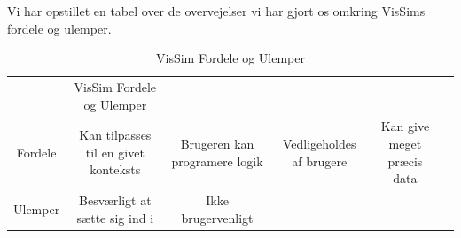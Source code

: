 Vi har opstillet en tabel over de overvejelser vi har gjort os omkring VisSims fordele og ulemper.

\begin{table}[]
\centering
\caption{VisSim Fordele og Ulemper}
\label{VisSimProsAndCons}
\begin{tabular}{|c|c|c|c|c|c|}
		& VisSim Fordele og Ulemper				&								&						   &						    & \\
Fordele & Kan tilpasses til en givet konteksts	& Brugeren kan programere logik & Vedligeholdes af brugere & Kan give meget præcis data & \\
Ulemper & Besværligt at sætte sig ind i			& Ikke brugervenligt			&						   &							&
\end{tabular} 
\end{table}


